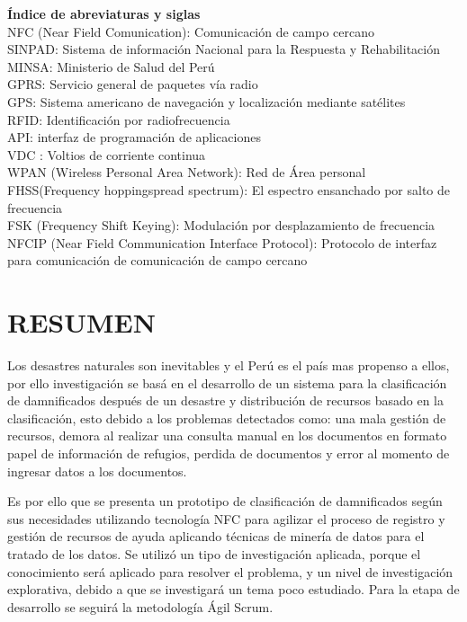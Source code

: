 \documentclass[11pt,openany]{book}
\newcounter{ns}
\begin{document}
	\tableofcontents
	\newpage
	\textbf{Índice de abreviaturas y siglas} \\[0.25cm]
	NFC (Near Field Comunication): Comunicación de campo cercano\\
	SINPAD: Sistema de información Nacional para la Respuesta y Rehabilitación\\
	MINSA: Ministerio de Salud del Perú\\
	GPRS: Servicio general de paquetes vía radio\\
	GPS: Sistema americano de navegación y localización mediante satélites\\
	RFID: Identificación por radiofrecuencia\\
	API: interfaz de programación  de aplicaciones\\
	VDC : Voltios de corriente continua\\
	WPAN (Wireless Personal Area Network): Red de Área personal\\
	FHSS(Frequency hoppingspread spectrum): El espectro ensanchado por salto de frecuencia\\
	FSK (Frequency Shift Keying): Modulación por desplazamiento de frecuencia\\
	NFCIP (Near Field Communication Interface Protocol): Protocolo de interfaz para comunicación de comunicación de campo cercano\\


	\newpage
	\listoftables
	\newpage
	\listoffigures


	\mainmatter
	\pagestyle{fancy}
	\lhead{\chaptername \ \thechapter} \chead{} \rhead{} 
	\lfoot{} \cfoot{\thepage} \rfoot{}
	\chapter*{RESUMEN}

	Los desastres naturales son inevitables y el Perú es el país mas propenso a ellos, por ello investigación se basá en el desarrollo de un sistema para la clasificación de damnificados después de un desastre y distribución de recursos basado en la clasificación, esto debido a los problemas detectados como: una mala gestión de recursos, demora al realizar una consulta manual en los documentos en formato papel de información de refugios, perdida de documentos  y error al momento de ingresar datos a los documentos.

	Es por ello que se presenta un prototipo de clasificación de damnificados según sus necesidades utilizando tecnología NFC para agilizar el proceso de registro y gestión de recursos de ayuda aplicando técnicas de minería de datos para el tratado de los datos.
	Se utilizó un tipo de investigación aplicada, porque el conocimiento será aplicado para resolver el problema, y un nivel de investigación explorativa, debido a que se investigará un tema poco estudiado. Para la etapa de desarrollo se seguirá la metodología Ágil Scrum.
\end{document}
